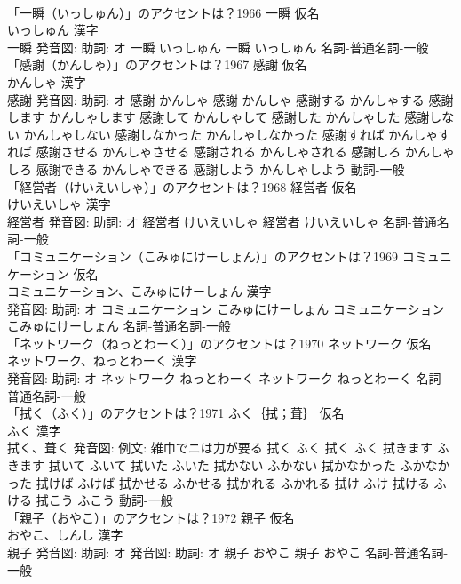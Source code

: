 \documentclass[8pt]{extreport}
\begin{document}
\begin{CJK}{UTF8}{min}
\\	「一瞬（いっしゅん）」のアクセントは？1966	一瞬 仮名　
\\	いっしゅん 漢字　
\\	一瞬 発音図: 助詞: オ	一瞬 いっしゅん		一瞬 いっしゅん				名詞-普通名詞-一般 
\\	「感謝（かんしゃ）」のアクセントは？1967	感謝 仮名　
\\	かんしゃ 漢字　
\\	感謝 発音図: 助詞: オ	感謝 かんしゃ		感謝 かんしゃ 感謝する かんしゃする 感謝します かんしゃします 感謝して かんしゃして 感謝した かんしゃした 感謝しない かんしゃしない 感謝しなかった かんしゃしなかった 感謝すれば かんしゃすれば 感謝させる かんしゃさせる 感謝される かんしゃされる 感謝しろ かんしゃしろ 感謝できる かんしゃできる 感謝しよう かんしゃしよう				動詞-一般 
\\	「経営者（けいえいしゃ）」のアクセントは？1968	経営者 仮名　
\\	けいえいしゃ 漢字　
\\	経営者 発音図: 助詞: オ	経営者 けいえいしゃ		経営者 けいえいしゃ				名詞-普通名詞-一般 
\\	「コミュニケーション（こみゅにけーしょん）」のアクセントは？1969	コミュニケーション 仮名　
\\	コミュニケーション、こみゅにけーしょん 漢字　
\\	発音図: 助詞: オ	コミュニケーション こみゅにけーしょん		コミュニケーション こみゅにけーしょん				名詞-普通名詞-一般 
\\	「ネットワーク（ねっとわーく）」のアクセントは？1970	ネットワーク 仮名　
\\	ネットワーク、ねっとわーく 漢字　
\\	発音図: 助詞: オ	ネットワーク ねっとわーく		ネットワーク ねっとわーく				名詞-普通名詞-一般 
\\	「拭く（ふく）」のアクセントは？1971	ふく｛拭；葺｝ 仮名　
\\	ふく 漢字　
\\	拭く、葺く 発音図: 例文: 雑巾でニは力が要る	拭く ふく		拭く ふく 拭きます ふきます 拭いて ふいて 拭いた ふいた 拭かない ふかない 拭かなかった ふかなかった 拭けば ふけば 拭かせる ふかせる 拭かれる ふかれる 拭け ふけ 拭ける ふける 拭こう ふこう				動詞-一般 
\\	「親子（おやこ）」のアクセントは？1972	親子 仮名　
\\	おやこ、しんし 漢字　
\\	親子 発音図: 助詞: オ 発音図: 助詞: オ	親子 おやこ		親子 おやこ				名詞-普通名詞-一般 

\end{CJK}
\end{document}

